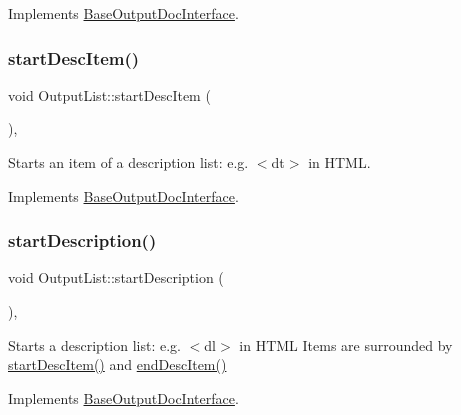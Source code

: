 Implements \mbox{\hyperlink{class_base_output_doc_interface_ab19fc767b08c25b0ca7c976d24799bda}{Base\+Output\+Doc\+Interface}}.

\mbox{\label{class_output_list_a021752b31f2577c15d6cef3e858c84d8}} 
\subsubsection{\texorpdfstring{startDescItem()}{startDescItem()}}
{\footnotesize\ttfamily void Output\+List\+::start\+Desc\+Item (\begin{DoxyParamCaption}{ }\end{DoxyParamCaption})\hspace{0.3cm}{\ttfamily [inline]}, {\ttfamily [virtual]}}

Starts an item of a description list\+: e.\+g. {\ttfamily $<$dt$>$} in H\+T\+ML. 

Implements \mbox{\hyperlink{class_base_output_doc_interface_a5d1cc59d94c3f529c90e0a06704be181}{Base\+Output\+Doc\+Interface}}.

\mbox{\label{class_output_list_a63dfb00b7d99d58acfb89473ab8ac7d8}} 
\subsubsection{\texorpdfstring{startDescription()}{startDescription()}}
{\footnotesize\ttfamily void Output\+List\+::start\+Description (\begin{DoxyParamCaption}{ }\end{DoxyParamCaption})\hspace{0.3cm}{\ttfamily [inline]}, {\ttfamily [virtual]}}

Starts a description list\+: e.\+g. {\ttfamily $<$dl$>$} in H\+T\+ML Items are surrounded by \mbox{\hyperlink{class_output_list_a021752b31f2577c15d6cef3e858c84d8}{start\+Desc\+Item()}} and \mbox{\hyperlink{class_output_list_aca7c1dd564ed727ce77f9f2bc43a74ea}{end\+Desc\+Item()}} 

Implements \mbox{\hyperlink{class_base_output_doc_interface_ac9c801c3ad0b50e3e69be184b50c2fef}{Base\+Output\+Doc\+Interface}}.

